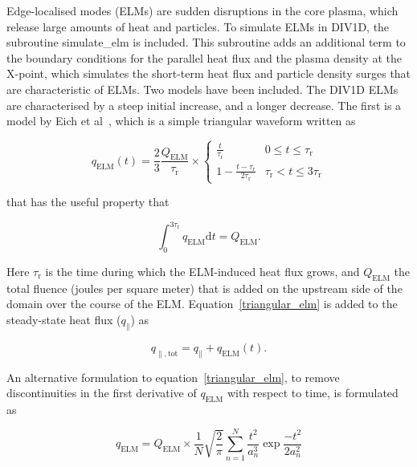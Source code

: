\documentclass[amsmath,amssymb,a4]{revtex4-2}
\begin{document}
Edge-localised modes (ELMs) are sudden disruptions in the core plasma, which release large amounts of heat and particles. To simulate ELMs in DIV1D, the subroutine simulate\_elm is included. This subroutine adds an additional term to the boundary conditions for the parallel heat flux and the plasma density at the X-point, which simulates the short-term  heat flux and particle density surges that are characteristic of ELMs. Two models have been included. The DIV1D ELMs are characterised by a steep initial increase, and a longer decrease. The first is a model by Eich et al~\cite{eich2017}, which is a simple triangular waveform written as

\begin{equation}
\label{triangular_elm}
q_{\mathrm{ELM}}(t)=\frac{2}{3}\frac{Q_{\mathrm{ELM}}}{\tau_{\mathrm{r}}}\times
\left\{
\begin{matrix}
\frac{t}{\tau_{\mathrm{\mathrm{r}}}} & 
0 \leq t \leq \tau_{\mathrm{r}} \\
1-\frac{t-\tau_{\mathrm{r}}}{2\tau_{\mathrm{r}}} &
\tau_{\mathrm{r}} < t \leq 3\tau_{\mathrm{r}}
\end{matrix}
\right.
\end{equation}

that has the useful property that

\begin{equation}
\int_{0}^{3\tau_{\mathrm{r}}} q_{\mathrm{ELM}} \mathrm{d}t=Q_{\mathrm{ELM}}.
\end{equation}

Here $\tau_{\mathrm{r}}$ is the time during which the ELM-induced heat flux grows, and $Q_{\mathrm{ELM}}$ the total fluence (joules per square meter) that is added on the upstream side of the domain over the course of the ELM. Equation~\ref{triangular_elm} is added to the steady-state heat flux ($q_{\parallel}$) as

\begin{equation}
\label{elm_boundary_condition}
q_{\parallel,\mathrm{tot}}=q_{\parallel}+q_{\mathrm{ELM}}(t).
\end{equation}

An alternative formulation to equation~\ref{triangular_elm}, to remove discontinuities in the first derivative of $q_{\mathrm{ELM}}$ with respect to time, is formulated as

\begin{equation}
\label{maxwell_boltzmann_elm}
q_{\mathrm{ELM}} = Q_{\mathrm{ELM}}\times
\frac{1}{N}\sqrt{\frac{2}{\pi}}
\sum_{n=1}^{N} \frac{t^2}{a_{n}^3}\exp{\frac{-t^2}{2a_n^2}}
\end{equation}
\end{document}
